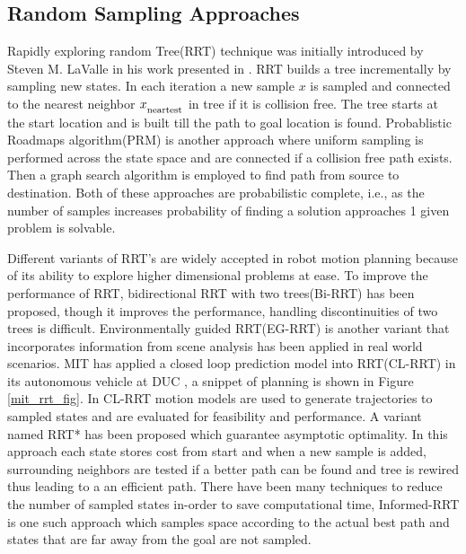 \subsection{Random Sampling Approaches}
\label{rw_incremental_search}
Rapidly exploring random Tree(RRT) technique was initially introduced by Steven M. LaValle in his work presented in \cite{Lavalle_rrt}. RRT builds a tree incrementally by sampling new states. In each iteration a new sample $x$ is sampled and connected to the nearest neighbor $x_\textsubscript{neartest}$ in tree if it is collision free. The tree starts at the start location and is built till the path to goal location is found. Probablistic Roadmaps algorithm\cite{prm}(PRM) is another approach where uniform sampling is performed across the state space and are connected if a collision free path exists. Then a graph search algorithm is employed to find path from source to destination. Both of these approaches are probabilistic complete, i.e., as the number of samples increases probability of finding a solution approaches 1 given problem is solvable. 

Different variants of RRT's are widely accepted in robot motion planning because of its ability to explore higher dimensional problems at ease\cite{rrt_higher_dimension}. To improve the performance of RRT, bidirectional RRT with two trees(Bi-RRT) has been proposed, though it improves the performance, handling discontinuities of two trees is difficult\cite{birrt}. Environmentally guided RRT(EG-RRT) is another variant that incorporates information from scene analysis has been applied in real world scenarios\cite{egrrt}. MIT has applied a closed loop prediction model into RRT(CL-RRT) in its autonomous vehicle at DUC \cite{mit_rrt}, a snippet of planning is shown in Figure \ref{mit_rrt_fig}. In CL-RRT motion models are used to generate trajectories to sampled states and are evaluated for feasibility and performance. A variant named RRT* \cite{rrt_star} has been proposed which guarantee asymptotic optimality.  In this approach each state stores cost from start and when a new sample is added, surrounding neighbors are tested if a better path can be found and tree is rewired thus leading to a an efficient path. There have been many techniques to reduce the number of sampled states in-order to save computational time, Informed-RRT \cite{informed_rrt} is one such approach which samples space according to the actual best path and states that are far away from the goal are not sampled.

